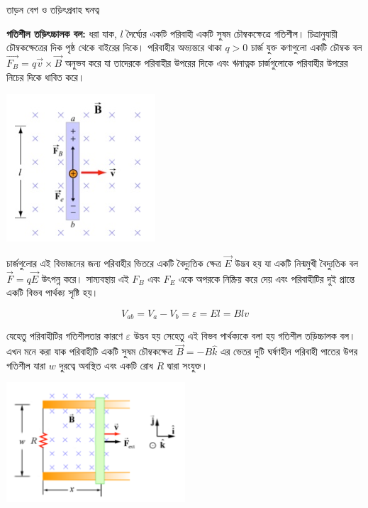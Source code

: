 \documentclass{article}
\begin{document}
\begin{LARGE}
\begin{center}
তাড়ন বেগ ও তড়িৎপ্রবাহ ঘনত্ব
\end{center}
\end{LARGE}
\textbf{গতিশীল তড়িৎচ্চালক বল:} ধরা যাক,  $ l $ দৈর্ঘ্যের একটি পরিবাহী একটি সুষম চৌম্বকক্ষেত্রে গতিশীল। চিত্রানুযায়ী  চৌম্বকক্ষেত্রের দিক পৃষ্ঠ থেকে বাইরের দিকে। পরিবাহীর অভ্যন্তরে থাকা $ q>0 $ চার্জ যুক্ত কণাগুলো একটি চৌম্বক বল $ \vec{F_{B}} = q\vec{v}\times \vec{B} $ অনুভব করে যা তাদেরকে পরিবাহীর উপরের দিকে এবং ঋনাত্নক চার্জগুলোকে পরিবাহীর উপরের নিচের দিকে ধাবিত করে। \\

\begin{center}
\includegraphics{2018-08-03_152836.png}
\end{center}


চার্জগুলোর এই বিভাজনের জন্য পরিবাহীর ভিতরে একটি বৈদ্যুতিক ক্ষেত্র $ \vec{E} $ উদ্ভব হয় যা একটি নিন্মমুখী বৈদ্যুতিক বল $ \vec{F} = q\vec{E} $ উৎপন্ন করে। সাম্যবস্থায় এই $ F_{B} $ এবং $ F_{E} $ একে অপরকে নিষ্ক্রিয় করে দেয় এবং পরিবাহীটির দুই প্রান্তে একটি বিভব পার্থক্য সৃষ্টি হয়।

\[V_{ab} = V_{a}-V_{b} = \varepsilon = El=Blv\]


যেহেতু পরিবাহীটির গতিশীলতার কারণে $ \varepsilon $ উদ্ভব হয় সেহেতু এই বিভব পার্থক্যকে বলা হয় গতিশীল তড়িচ্চালক বল।\\

এখন মনে করা যাক পরিবাহীটি একটি সুষম চৌম্বকক্ষেত্র $ \vec{B} = -B\hat{k} $ এর ভেতর দুটি ঘর্ষণহীন পরিবাহী পাতের উপর গতিশীল যারা $ w $ দুরত্বে অবস্থিত এবং একটি রোধ $ R $ দ্বারা সংযুক্ত।
\begin{center}
\includegraphics[width=0.5\textwidth]{2018-08-03_152853.png}
\end{center}
\end{document}
